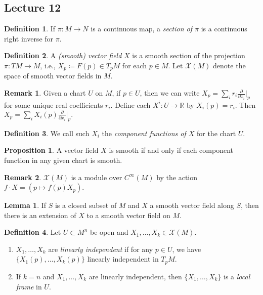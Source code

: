 \documentclass[10pt,letterpaper,cm]{nupset}
\theoremstyle{definition}
\newtheorem*{definition}{Definition}
\newtheorem{remark}{Remark}
\newtheorem{lemma}{Lemma}
\newtheorem{prop}{Proposition}
\newcommand{\R}{\mathbb R}
\newcommand{\1}{\mathbf{1}}
\newcommand{\0}{\vec 0}
\begin{document}
\subsection{Lecture 12}

\begin{definition}
If $\pi : M \to N$ is a continuous map, a \textit{section of $\pi$} is a continuous right inverse for $\pi$.
\end{definition}

\begin{definition}
A \textit{(smooth) vector field} $X$ is a smooth section of the projection $\pi : TM \to M$, i.e., $X_p\coloneqq  F(p) \in T_pM$ for each $p \in M$. 
Let $\mathscr{X}(M)$ denote the space of smooth vector fields in $M$.
\end{definition}

\begin{remark}
Given a chart $U$ on $M$, if $p\in U$, then we can write $X_p = \sum_i r_i \frac{\partial}{\partial x_i}\rvert_p$ for some unique real coefficients $r_i$. Define each $X^i : U \to \R$ by $X_i(p) = r_i$. Then $X_p = \sum_i X_i(p) \frac{\partial}{\partial x_i}\rvert_p.$
\end{remark}

\begin{definition}
We call such $X_i$ the \textit{component functions of $X$} for the chart $U$.
\end{definition}

\begin{prop}
A vector field $X$ is smooth if and only if each component function in any given chart is smooth.
\end{prop}

\begin{remark}
$\mathscr{X}(M)$ is a module over $C^{\infty}(M)$ by the action $f \cdot X = (p \mapsto f(p)X_p)$.
\end{remark}

\begin{lemma}
If $S$ is a closed subset of $M$ and $X$ a smooth vector field along $S$, then there is an extension of $X$ to a smooth vector field on $M$.
\end{lemma}

\begin{definition} Let $U \subset M^n$ be open and $X_1, \ldots, X_k \in \mathscr{X}(M)$. 
\begin{enumerate}
\item  $X_1, \ldots, X_k$ are \textit{linearly independent} if for any $p\in U$, we have $\{X_1(p), \ldots, X_k(p)\}$ linearly independent in $T_pM$.
\item If $k=n$ and $X_1, \ldots, X_k$ are linearly independent, then $\{X_1, \ldots, X_k\}$ is a \textit{local frame} in $U$.
\end{enumerate}
\end{definition}
\end{document}
